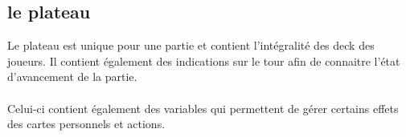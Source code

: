 \documentclass[12pt]{article}
\begin{document}
\subsection{le plateau}

Le plateau est unique pour une partie et contient l'intégralité des deck des joueurs. Il contient également des indications sur le tour afin de connaitre l'état d'avancement de la partie.

\paragraph{}
Celui-ci contient également des variables qui permettent de gérer certains effets des cartes personnels et actions.
\end{document}
